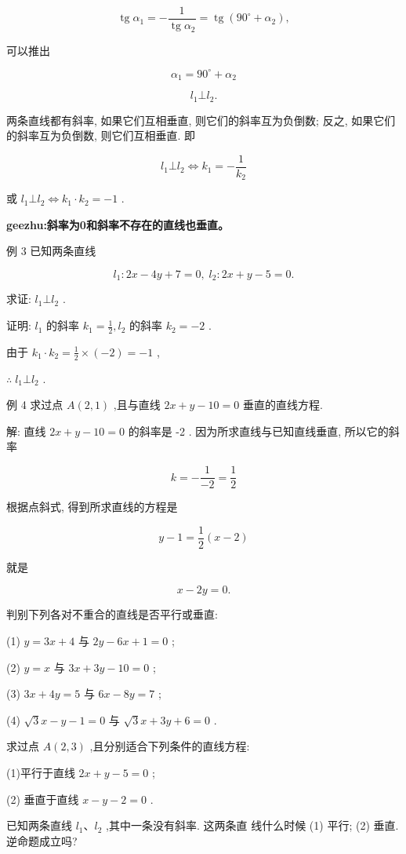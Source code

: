 \documentclass[lang=cn,newtx,12pt,scheme=chinese]{elegantbook}
\begin{document}
\[
  \operatorname{tg}{\alpha }_{1} = - \frac{1}{\operatorname{tg}{\alpha }_{2}} = \operatorname{tg}\left( {{90}^{ \circ } + {\alpha }_{2}}\right) ,
\]

可以推出

\[
    {\alpha }_{1} = {90}^{ \circ } + {\alpha }_{2}
\]

\[
    {l}_{1} \bot {l}_{2}\text{.}
\]
\begin{corollary}
两条直线都有斜率, 如果它们互相垂直, 则它们的斜率互为负倒数; 反之, 如果它们的斜率互为负倒数, 则它们互相垂直. 即

\[
    {l}_{1} \bot {l}_{2} \Leftrightarrow {k}_{1} = - \frac{1}{{k}_{2}}
\]

或 \({l}_{1} \bot {l}_{2} \Leftrightarrow {k}_{1} \cdot {k}_{2} = - 1\) .
\end{corollary}

\textbf{geezhu:斜率为0和斜率不存在的直线也垂直。}

例 3 已知两条直线

\[
    {l}_{1} : {2x} - {4y} + 7 = 0,\;{l}_{2} : {2x} + y - 5 = 0.
\]

求证: \({l}_{1} \bot {l}_{2}\) .

证明: \({l}_{1}\) 的斜率 \({k}_{1} = \frac{1}{2},{l}_{2}\) 的斜率 \({k}_{2} = - 2\) .

由于 \({k}_{1} \cdot {k}_{2} = \frac{1}{2} \times \left( {-2}\right) = - 1\) ,

\(\therefore \;{l}_{1} \bot {l}_{2}\) .

例 4 求过点 \(A\left( {2,1}\right)\) ,且与直线 \({2x} + y - {10} = 0\) 垂直的直线方程.

解: 直线 \({2x} + y - {10} = 0\) 的斜率是 -2 . 因为所求直线与已知直线垂直, 所以它的斜率

\[
  k = - \frac{1}{-2} = \frac{1}{2}
\]

根据点斜式, 得到所求直线的方程是

\[
  y - 1 = \frac{1}{2}\left( {x - 2}\right)
\]

就是

\[
  x - {2y} = 0.
\]

\begin{problemset}[练习]

\item 判别下列各对不重合的直线是否平行或垂直:

(1) \(y = {3x} + 4\) 与 \({2y} - {6x} + 1 = 0\) ;

(2) \(y = x\) 与 \({3x} + {3y} - {10} = 0\) ;

(3) \({3x} + {4y} = 5\) 与 \({6x} - {8y} = 7\) ;

(4) \(\sqrt{3}x - y - 1 = 0\) 与 \(\sqrt{3}x + {3y} + 6 = 0\) .

\item 求过点 \(A\left( {2,3}\right)\) ,且分别适合下列条件的直线方程:

(1)平行于直线 \({2x} + y - 5 = 0\) ;

(2) 垂直于直线 \(x - y - 2 = 0\) .

\item 已知两条直线 \({l}_{1}\text{、}{l}_{2}\) ,其中一条没有斜率. 这两条直 线什么时候 (1) 平行; (2) 垂直. 逆命题成立吗?
\end{problemset}
\end{document}
